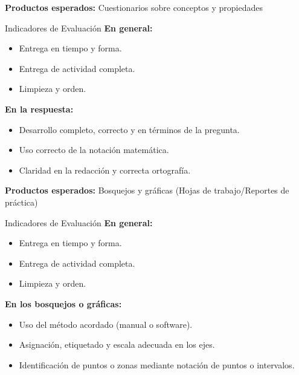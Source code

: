 \documentclass[11pt]{article}
\begin{document}
\begin{tcolorbox}
	\textbf{Productos esperados:}
	Cuestionarios sobre conceptos y propiedades
	
	\begin{mybox}{Indicadores de Evaluación}
		\textbf{En general:}
		\begin{itemize}
			\setlength{\itemsep}{0pt}
			\setlength{\parskip}{0pt}
			\item Entrega en tiempo y forma.
			\item Entrega de actividad completa.
			\item Limpieza y orden.
			
		\end{itemize}
		\textbf{En la respuesta:}
		\begin{itemize}
			\setlength{\itemsep}{0pt}
			\setlength{\parskip}{0pt}
			\item Desarrollo completo, correcto y en términos de la pregunta.
			\item Uso correcto de la notación matemática.
			\item Claridad en la redacción y correcta ortografía.
		\end{itemize}
	\end{mybox}

	\textbf{Productos esperados:}
	Bosquejos y gráficas (Hojas de trabajo/Reportes de práctica)
	
	\begin{mybox}{Indicadores de Evaluación}
		\textbf{En general:}
		\begin{itemize}
			\setlength{\itemsep}{0pt}
			\setlength{\parskip}{0pt}
			\item Entrega en tiempo y forma.
			\item Entrega de actividad completa.
			\item Limpieza y orden.			
		\end{itemize}
		\textbf{En los bosquejos o gráficas:}
		\begin{itemize}
			\setlength{\itemsep}{0pt}
			\setlength{\parskip}{0pt}
			\item Uso del método acordado (manual o software).
			\item Asignación, etiquetado y escala adecuada en los ejes.
			\item Identificación de puntos o zonas mediante notación de puntos o intervalos.
		\end{itemize}
	\end{mybox}


\end{tcolorbox}
\end{document}

